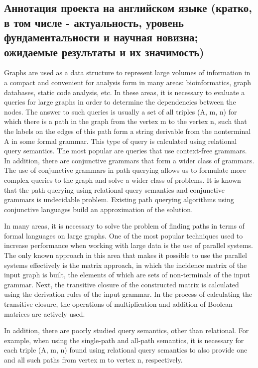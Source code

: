 \documentclass[12pt]{article}  %
\theoremstyle{remark}
\begin{document}
\subsection{Аннотация проекта на английском языке (кратко, в том числе - актуальность, уровень фундаментальности и научная новизна; ожидаемые результаты и их значимость)}
Graphs are used as a data structure to represent large volumes of information in a compact and convenient for analysis form in many areas: bioinformatics, graph databases, static code analysis, etc. In these areas, it is necessary to evaluate a queries for large graphs in order to determine the dependencies between the nodes. The answer to such queries is usually a set of all triples (A, m, n) for which there is a path in the graph from the vertex m to the vertex n, such that the labels on the edges of this path form a string derivable from the nonterminal A in some formal grammar. This type of query is calculated using relational query semantics. The most popular are queries that use context-free grammars. In addition, there are conjunctive grammars that form a wider class of grammars. The use of conjunctive grammars in path querying allows us to formulate more complex queries to the graph and solve a wider class of problems. It is known that the path querying using relational query semantics and conjunctive grammars is undecidable problem. Existing path querying algorithms using conjunctive languages build an approximation of the solution.

In many areas, it is necessary to solve the problem of finding paths in terms of formal languages on large graphs. One of the most popular techniques used to increase performance when working with large data is the use of parallel systems. The only known approach in this area that makes it possible to use the parallel systems effectively is the matrix approach, in which the incidence matrix of the input graph is built, the elements of which are sets of non-terminals of the input grammar. Next, the transitive closure of the constructed matrix is calculated using the derivation rules of the input grammar. In the process of calculating the transitive closure, the operations of multiplication and addition of Boolean matrices are actively used.

In addition, there are poorly studied query semantics, other than relational. For example, when using the single-path and all-path semantics, it is necessary for each triple (A, m, n) found using relational query semantics to also provide one and all such paths from vertex m to vertex n, respectively.
\end{document}
